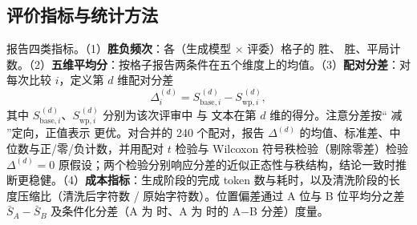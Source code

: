 \subsection{评价指标与统计方法}\label{sec:metrics}

报告四类指标。（1）\textbf{胜负频次}：各（生成模型 $\times$ 评委）格子的 \baseline{} 胜、\wordpairs{} 胜、平局计数。（2）\textbf{五维平均分}：按格子报告两条件在五个维度上的均值。（3）\textbf{配对分差}：对每次比较 $i$，定义第 $d$ 维配对分差
\begin{equation}\label{eq:diff}
\Delta_i^{(d)} = S^{\,(d)}_{\text{base},i} - S^{\,(d)}_{\text{wp},i},
\end{equation}
其中 $S^{\,(d)}_{\text{base},i}$、$S^{\,(d)}_{\text{wp},i}$ 分别为该次评审中 \baseline{} 与 \wordpairs{} 文本在第 $d$ 维的得分。注意分差按“\baseline{} 减 \wordpairs{}”定向，正值表示 \baseline{} 更优。对合并的 240 个配对，报告 $\Delta^{(d)}$ 的均值、标准差、中位数与正/零/负计数，并用配对 $t$ 检验与 Wilcoxon 符号秩检验（剔除零差）检验 $\Delta^{(d)}=0$ 原假设；两个检验分别响应分差的近似正态性与秩结构，结论一致时推断更稳健。（4）\textbf{成本指标}：生成阶段的完成 token 数与耗时，以及清洗阶段的长度压缩比（清洗后字符数 / 原始字符数）。位置偏差通过 A 位与 B 位平均分之差 $\bar S_A - \bar S_B$ 及条件化分差（A 为 \baseline{} 时、A 为 \wordpairs{} 时的 A$-$B 分差）度量。
